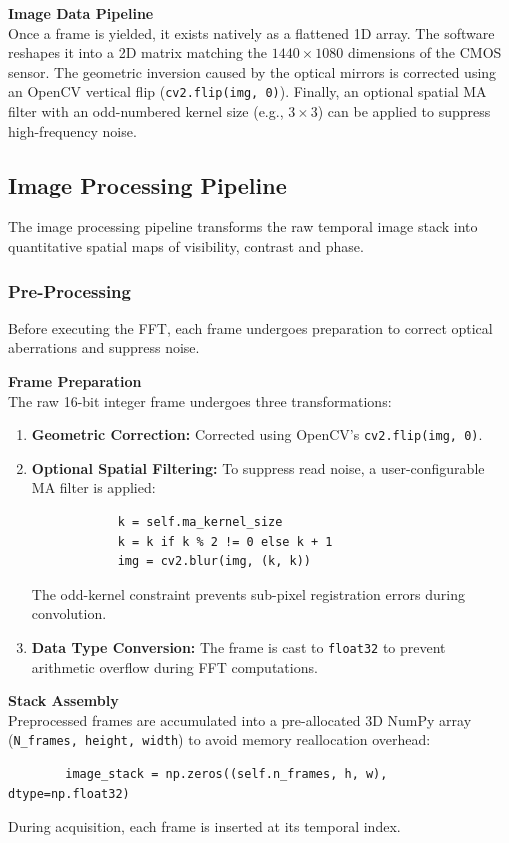 \documentclass[12pt,a4paper]{article}
\begin{document}
        \textbf{Image Data Pipeline} \\
        Once a frame is yielded, it exists natively as a flattened 1D array. The software reshapes it into a 2D matrix matching the $1440 \times 1080$ dimensions of the \ac{CMOS} sensor. The geometric inversion caused by the optical mirrors is corrected using an OpenCV vertical flip (\texttt{cv2.flip(img, 0)}). Finally, an optional spatial \ac{MA} filter with an odd-numbered kernel size (e.g., $3\times3$) can be applied to suppress high-frequency noise.

    \subsection{Image Processing Pipeline}
        The image processing pipeline transforms the raw temporal image stack into quantitative spatial maps of visibility, contrast and phase. 

        \subsubsection{Pre-Processing}
        Before executing the \ac{FFT}, each frame undergoes preparation to correct optical aberrations and suppress noise.

        \textbf{Frame Preparation} \\
        The raw 16-bit integer frame undergoes three transformations:
        \begin{enumerate}
            \item \textbf{Geometric Correction:} Corrected using OpenCV's \texttt{cv2.flip(img, 0)}.
            \item \textbf{Optional Spatial Filtering:} To suppress read noise, a user-configurable \ac{MA} filter is applied:
            \begin{verbatim}
            k = self.ma_kernel_size
            k = k if k % 2 != 0 else k + 1
            img = cv2.blur(img, (k, k))
            \end{verbatim}
            The odd-kernel constraint prevents sub-pixel registration errors during convolution.
            \item \textbf{Data Type Conversion:} The frame is cast to \texttt{float32} to prevent arithmetic overflow during \ac{FFT} computations.
        \end{enumerate}

        \textbf{Stack Assembly} \\
        Preprocessed frames are accumulated into a pre-allocated 3D NumPy array (\texttt{N\_frames, height, width}) to avoid memory reallocation overhead:
        \begin{verbatim}
        image_stack = np.zeros((self.n_frames, h, w), dtype=np.float32)
        \end{verbatim}
        During acquisition, each frame is inserted at its temporal index.
\end{document}
